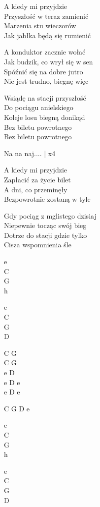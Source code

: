 \begin{text}
    A kiedy mi przyjdzie\\
    Przyszłość w teraz zamienić\\
    Marzenia stu wieczorów\\
    Jak jabłka będą się rumienić

    A konduktor zacznie wołać\\
    Jak budzik, co wrył się w sen\\
    Spóźnić się na dobre jutro\\
    Nie jest trudno, biegnę więc	

    \vin Wsiądę na stacji przyszłość\\
    \vin Do pociągu anielskiego\\
    \vin Koleje losu biegną donikąd\\
    \vin Bez biletu powrotnego\\
    \vin Bez biletu powrotnego	

    \vin Na na naj.... | x4	

    A kiedy mi przyjdzie\\
    Zapłacić za życie bilet\\
    A dni, co przeminęły\\
    Bezpowrotnie zostaną w tyle

    Gdy pociąg z mglistego dzisiaj\\
    Niepewnie tocząc swój bieg\\
    Dotrze do stacji gdzie tylko\\
    Cisza wspomnienia śle

\end{text}
\begin{chord}
    e\\
    C\\
    G\\
    h

    e\\
    C\\
    G\\
    D

    C G\\
    C G\\
    e D\\
    e D e\\
    e D e

    C G D e

    e\\
    C\\
    G\\
    h

    e\\
    C\\
    G\\
    D


\end{chord}